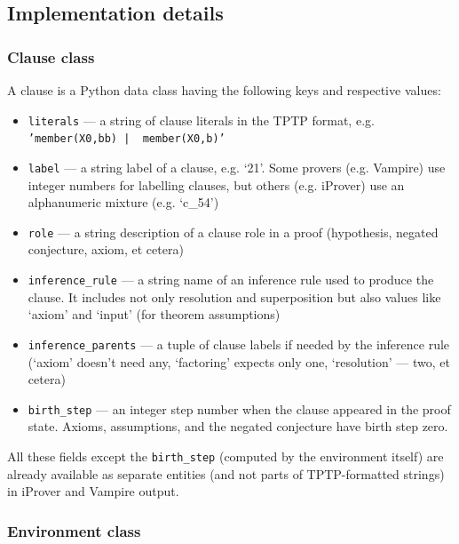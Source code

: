\documentclass[runningheads]{llncs}
\begin{document}
\subsection{Implementation details}
\subsubsection{Clause class}
A clause is a Python data class having the following keys and respective values:

\begin{itemize}
\item \texttt{literals} --- a string of clause literals in the TPTP format, e.g. \texttt{'member(X0,bb) | ~member(X0,b)'}
\item \texttt{label} --- a string label of a clause, e.g. `21'. Some provers (e.g. Vampire) use integer numbers for labelling clauses, but others (e.g. iProver) use an alphanumeric mixture (e.g. `c\_54')
\item \texttt{role} --- a string description of a clause role in a proof (hypothesis, negated conjecture, axiom, et cetera)
\item \texttt{inference\_rule} --- a string name of an inference rule used to produce the clause. It includes not only resolution and superposition but also values like `axiom' and `input' (for theorem assumptions)
\item \texttt{inference\_parents} --- a tuple of clause labels if needed by the inference rule (`axiom' doesn't need any, `factoring' expects only one, `resolution' --- two, et cetera)
\item \texttt{birth\_step} --- an integer step number when the clause appeared in the proof state. Axioms, assumptions, and the negated conjecture have birth step zero.
\end{itemize}

All these fields except the \texttt{birth\_step} (computed by the environment itself) are already available as separate entities (and not parts of TPTP-formatted strings) in iProver and Vampire output.
\subsubsection{Environment class}
\end{document}
